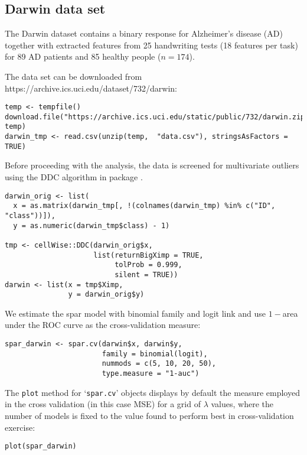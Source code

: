 \documentclass[
  article]{jss}
\begin{document}
\subsection{Darwin data set}\label{darwin-data-set}

The Darwin dataset \citep{CILIA2022darwin} contains a binary response
for Alzheimer's disease (AD) together with extracted features from 25
handwriting tests (18 features per task) for 89 AD patients and 85
healthy people (\(n=174\)).

The data set can be downloaded from
https://archive.ics.uci.edu/dataset/732/darwin:

\begin{verbatim}
temp <- tempfile()
download.file("https://archive.ics.uci.edu/static/public/732/darwin.zip", temp)
darwin_tmp <- read.csv(unzip(temp,  "data.csv"), stringsAsFactors = TRUE)
\end{verbatim}

Before proceeding with the analysis, the data is screened for
multivariate outliers using the DDC algorithm in package .

\begin{verbatim}
darwin_orig <- list(
  x = as.matrix(darwin_tmp[, !(colnames(darwin_tmp) %in% c("ID", "class"))]),
  y = as.numeric(darwin_tmp$class) - 1)

tmp <- cellWise::DDC(darwin_orig$x,
                     list(returnBigXimp = TRUE, 
                          tolProb = 0.999,
                          silent = TRUE))
darwin <- list(x = tmp$Ximp,
               y = darwin_orig$y)
\end{verbatim}

We estimate the spar model with binomial family and logit link and use
\(1-\)area under the ROC curve as the cross-validation measure:

\begin{verbatim}
spar_darwin <- spar.cv(darwin$x, darwin$y,
                       family = binomial(logit),
                       nummods = c(5, 10, 20, 50),
                       type.measure = "1-auc")
\end{verbatim}

The \texttt{plot} method for `\texttt{spar.cv}' objects displays by
default the measure employed in the cross validation (in this case MSE)
for a grid of \(\lambda\) values, where the number of models is fixed to
the value found to perform best in cross-validation exercise:

\begin{verbatim}
plot(spar_darwin)
\end{verbatim}
\end{document}
